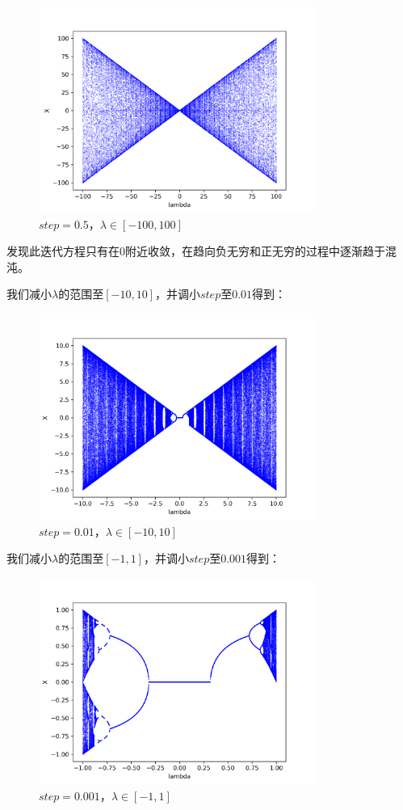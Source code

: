 \documentclass[a4paper,11pt]{article}
\begin{document}
\begin{figure}[!htbp]        
\centering
\includegraphics[bb= 0 0 450 370,width=9cm]{s=0.5.png}      
\caption{ $step = 0.5$，$\lambda \in [-100,100]$}      
\end{figure}

\newpage 发现此迭代方程只有在$0$附近收敛，在趋向负无穷和正无穷的过程中逐渐趋于混沌。

我们减小$\lambda$的范围至$[-10,10]$，并调小$step$至$0.01$得到：
\begin{figure}[!htbp]        
\centering
\includegraphics[bb= 0 0 450 370,width=9cm]{s=0.01.png}      
\caption{ $step = 0.01$，$\lambda \in [-10,10]$}      
\end{figure}

我们减小$\lambda$的范围至$[-1,1]$，并调小$step$至$0.001$得到：

\begin{figure}[!htbp]        
\centering
\includegraphics[bb= 0 0 450 370,width=9cm]{s=0.001.png}      
\caption{ $step = 0.001$，$\lambda \in [-1,1]$}      
\end{figure}
\end{document}
